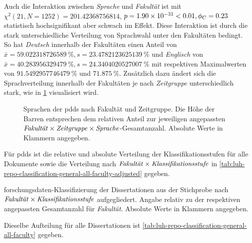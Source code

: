 Auch die Interaktion zwischen \textit{Sprache} und \textit{Fakultät} ist mit $\chi^2 (\num{21}, N = \num{1252}) = \num[round-mode=places,round-precision=2]{201.42368756814}$, $p = \num[round-mode=places,round-precision=2]{1.90053471088499E-31}<\num{0.01},\phi_C=\num[round-mode=places,round-precision=2]{0.231575430181447}$ statistisch hochsignifikant aber schwach im Effekt.
Diese Interaktion ist durch die stark unterschiedliche Verteilung von Sprachwahl unter den Fakultäten bedingt.
So hat \textit{Deutsch} innerhalb der Fakultäten einen Anteil von $\bar{x}=\SI[round-mode=places,round-precision=2]{59.022318726589}{\percent},s=\SI[round-mode=places,round-precision=2]{23.4782123625139}{\percent}$ und \textit{Englisch} von $\bar{x}=\SI[round-mode=places,round-precision=2]{40.283956329479}{\percent},s=\SI[round-mode=places,round-precision=2]{24.3404020527007}{\percent}$ mit respektiven Maximalwerten von $\SI[round-mode=places,round-precision=2]{91.5492957746479}{\percent}$ und $\SI[round-mode=places,round-precision=2]{71.875}{\percent}$.
Zusätzlich dazu ändert sich die Sprachverteilung innerhalb der Fakultäten je nach \textit{Zeitgruppe} unterschiedlich stark, wie in \cref{fig:luh-repo_sprache_x_fakultät_x_zeitgruppe} visualisiert wird.
\begin{figure}[!htbp]
    \resizebox{\ifdim\width>\textwidth\textwidth\else\width\fi}{!}{}
    \caption{Sprachen der \glspl{pdd} nach Fakultät und Zeitgruppe.
    Die Höhe der Barren entsprechen dem relativen Anteil zur jeweiligen angepassten $\text{\textit{Fakultät}}\times\text{\textit{Zeitgruppe}}\times\text{\textit{Sprache}}$-Gesamtanzahl.
    Absolute Werte in Klammern angegeben.}
    \label{fig:luh-repo_sprache_x_fakultät_x_zeitgruppe}
\end{figure}

Für \glspl{pdd} ist die relative und absolute Verteilung der Klassifikationsstufen für alle Dokumente sowie die Verteilung nach $\text{\textit{Fakultät}}\times\text{\textit{Klassifikationsstufe}}$ in \cref{tab:luh-repo-classification-general-all-faculty-adjusted} gegeben.
\begin{table}[!htbp]
	\caption{\gls{forschungsdaten}-Klassifizierung der Dissertationen aus der Stichprobe nach $\text{\textit{Fakultät}}\times\text{\textit{Klassifikationsstufe}}$ aufgegliedert.
    Angabe relativ zu der respektiven angepassten Gesamtanzahl für \textit{Fakultät}.
    Absolute Werte in Klammern angegeben.}
    
    \label{tab:luh-repo-classification-general-all-faculty-adjusted}
\end{table}
Dieselbe Aufteilung für alle Dissertationen ist \cref{tab:luh-repo-classification-general-all-faculty} gegeben.

